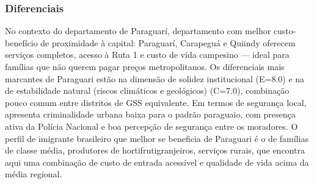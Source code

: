 \subsubsection*{Diferenciais}\label{dif-paraguari-0901}
No contexto do departamento de Paraguarí, departamento com melhor custo-benefício de proximidade à capital: Paraguarí, Carapeguá e Quiindy oferecem serviços completos, acesso à Ruta 1 e custo de vida campesino — ideal para famílias que não querem pagar preços metropolitanos. Os diferenciais mais marcantes de Paraguari estão na dimensão de solidez institucional (E=8.0) e na de estabilidade natural (riscos climáticos e geológicos) (C=7.0), combinação pouco comum entre distritos de GSS equivalente. Em termos de segurança local, apresenta criminalidade urbana baixa para o padrão paraguaio, com presença ativa da Polícia Nacional e boa percepção de segurança entre os moradores. O perfil de imigrante brasileiro que melhor se beneficia de Paraguari é o de famílias de classe média, produtores de hortifrutigranjeiros, serviços rurais, que encontra aqui uma combinação de custo de entrada acessível e qualidade de vida acima da média regional.
